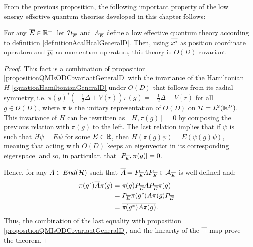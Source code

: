 From the previous proposition, the following important property of the low energy effective quantum theories developed in this chapter follows:
\begin{theorem}\label{theoremGeneralDEffectiveLowEnergyQuantumIsODCovariant}
For any $\overline{E} \in \mathbb{R}^+$, let $\mathcal H_{\overline{E}}$ and $\mathcal A_{\overline{E}}$ define a low effective quantum theory according to definition \ref{definitionAcalHcalGeneralD}. Then, using $\overline{x^i}$ as position coordinate operators and $\overline{p_i}$ as momentum operators, this theory is $O(D)$-covariant
\end{theorem}
\begin{proof}
This fact is a combination of proposition \ref{propositionQMIsODCovariantGeneralD} with the invariance of the Hamiltonian $H$ \ref{equationHamiltonianGeneralD} under $O(D)$ that follows from its radial symmetry, i.e. $\pi(g)^* (-\frac{1}{2} \Delta + V(r)) \pi(g) = -\frac{1}{2} \Delta + V(r)$ for all $g \in O(D)$, where $\pi$ is the unitary representation of $O(D)$ on $\mathcal H = L^2(\mathbb{R}^D)$. This invariance of $H$ can be rewritten as $[H, \pi(g)] = 0$ by composing the previous relation with $\pi(g)$ to the left. The last relation implies that if $\psi$ is such that $H \psi = E \psi$ for some $E \in \mathbb{R}$, then $H(\pi(g)\psi) = E(\psi(g)\psi)$, meaning that acting with $O(D)$ keeps an eigenvector in its corresponding eigenspace, and so, in particular, that $[P_{\overline{E}}, \pi(g)] = 0$.

Hence, for any $A \in End(\mathcal H)$ such that $\overline{A} = P_{\overline{E}} A P_{\overline{E}} \in \mathcal A_{\overline{E}}$ is well defined and:
\begin{align*}
    \pi(g^*) \overline{A} \pi(g) 
      &= \pi(g)P_{\overline{E}} A P_{\overline{E}} \pi(g)\\
      &= P_{\overline{E}} \pi(g^*) A \pi(g) P_{\overline{E}}\\
      &= \overline{\pi(g^*) A \pi(g)}.
\end{align*}
Thus, the combination of the last equality with proposition \ref{propositionQMIsODCovariantGeneralD}, and the linearity of the $\cut{\color{white} A}$ map prove the theorem.
\end{proof}


